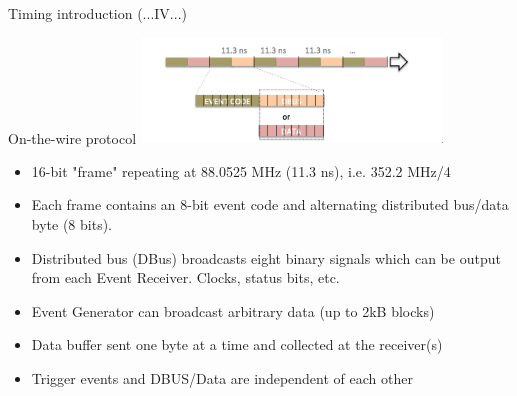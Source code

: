 \documentclass[
  9pt
  , table
  , ignorenonframetext
]{beamer}
\begin{document}
\begin{frame}{Timing introduction (...IV...)}
  \begin{block}{On-the-wire protocol}
    \centering
    \includegraphics[width=0.6\textwidth]{./pictures/BitStream.png}
    \begin{itemize}
      \item 16-bit "frame" repeating at 88.0525 MHz (11.3 ns), i.e. 352.2 MHz/4
      \item Each frame contains an 8-bit event code and alternating distributed bus/data byte (8 bits).
      \item Distributed bus (DBus) broadcasts eight binary signals which can be output from each Event Receiver. Clocks, status bits, etc.
      \item Event Generator can broadcast arbitrary data (up to 2kB blocks)
      \item Data buffer sent one byte at a time and collected at the receiver(s)
      \item Trigger events and DBUS/Data are independent of each other
    \end{itemize}
  \end{block}
\end{frame}
\end{document}

